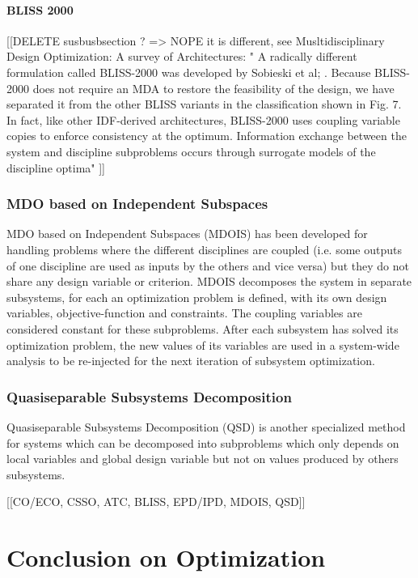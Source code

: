 \subsubsection{BLISS 2000}
[[DELETE susbusbsection ? => NOPE it is different, see Musltidisciplinary Design Optimization: A survey of Architectures:
"    A radically different formulation called BLISS-2000 was developed by Sobieski et al; . Because BLISS-2000
does not require an MDA to restore the feasibility of the design, we have separated it from the other BLISS variants
in the classification shown in Fig. 7. In fact, like other IDF-derived architectures, BLISS-2000 uses coupling variable
copies to enforce consistency at the optimum. Information exchange between the system and discipline subproblems
occurs through surrogate models of the discipline optima"
]]
   
\subsection{MDO based on Independent Subspaces}

MDO based on Independent Subspaces (MDOIS) \cite{NME:NME1380} has been developed for handling problems where the different disciplines are coupled (i.e. some outputs of one discipline are used as inputs by the others and vice versa) but they do not share any design variable or criterion.
MDOIS decomposes the system in separate subsystems, for each an optimization problem is defined, with its own design variables, objective-function and constraints. The coupling variables are considered constant for these subproblems. After each subsystem has solved its optimization problem, the new values of its variables are used in a system-wide analysis to be re-injected for the next iteration of subsystem optimization.

\subsection{Quasiseparable Subsystems Decomposition}

Quasiseparable Subsystems Decomposition (QSD) \cite{1389-4420} is another specialized method for systems which can be decomposed into subproblems which only depends on local variables and global design variable but not on values produced by others subsystems. 

[[CO/ECO, CSSO, ATC,  BLISS, EPD/IPD, MDOIS, QSD]]

\chapter{Conclusion on Optimization}

